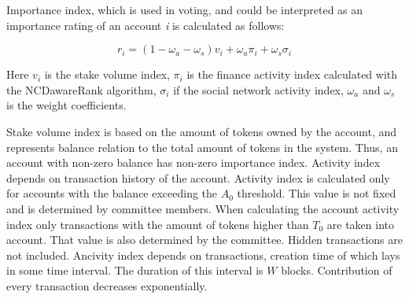 \documentclass[a4paper,12pt]{article}
\begin{document}
Importance index, which is used in voting, and could be interpreted as an importance rating of an account \textit{i} is calculated as follows: 

$$
r_i = (1 - \omega_a - \omega_s) v_i + \omega_a \pi_i + \omega_s \sigma_i
$$

Here $v_i$ is the stake volume index, $\pi_i$ is the finance activity index calculated with the NCDawareRank algorithm, $\sigma_i$ if the social network activity index, $\omega_a$ and $\omega_s$ is the weight coefficients. 


Stake volume index is based on the amount of tokens owned by the account, and represents balance relation to the total amount of tokens in the system. Thus, an account with non-zero balance has non-zero importance index. Activity index depends on transaction history of the account. Activity index is calculated only for accounts with the balance exceeding the $A_0$ threshold. This value is not fixed and is determined by committee members. When calculating the account activity index only transactions with the amount of tokens higher than $T_0$ are taken into account. That value is also determined by the committee. Hidden transactions are not included. Ancivity index depends on transactions, creation time of which lays in some time interval. The duration of this interval is $W$ blocks. Contribution of every transaction decreases exponentially.

\end{document}
